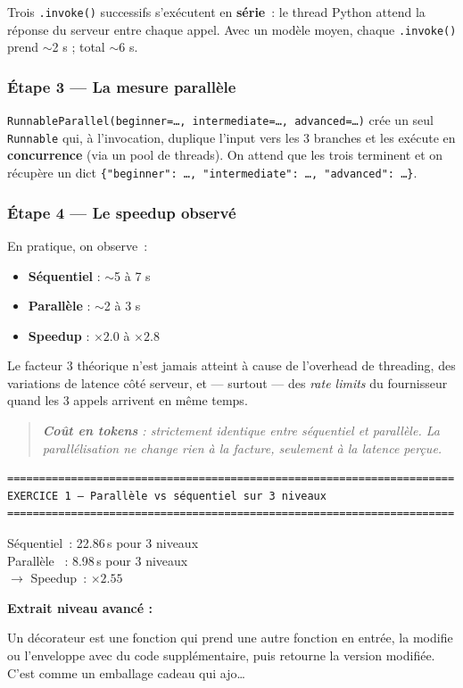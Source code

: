 \documentclass[11pt,a4paper]{article}
\begin{document}
Trois \texttt{.invoke()} successifs s'exécutent en \textbf{série}~: le
thread Python attend la réponse du serveur entre chaque appel. Avec un
modèle moyen, chaque \texttt{.invoke()} prend $\sim$2 s ; total $\sim$6 s.

\subsubsection*{Étape 3 — La mesure parallèle}

\texttt{RunnableParallel(beginner=\dots, intermediate=\dots, advanced=\dots)}
crée un seul \texttt{Runnable} qui, à l'invocation, duplique l'input vers
les 3 branches et les exécute en \textbf{concurrence} (via un pool de
threads). On attend que les trois terminent et on récupère un dict
\texttt{\{"beginner": \dots, "intermediate": \dots, "advanced": \dots\}}.

\subsubsection*{Étape 4 — Le speedup observé}

En pratique, on observe~:
\begin{itemize}[leftmargin=*]
  \item \textbf{Séquentiel} : $\sim$5 à 7 s
  \item \textbf{Parallèle}  : $\sim$2 à 3 s
  \item \textbf{Speedup}    : $\times 2.0$ à $\times 2.8$
\end{itemize}

Le facteur 3 théorique n'est jamais atteint à cause de l'overhead de
threading, des variations de latence côté serveur, et — surtout — des
\emph{rate limits} du fournisseur quand les 3 appels arrivent en même
temps.

\begin{quote}\itshape
\textbf{Coût en tokens} : strictement identique entre séquentiel et
parallèle. La parallélisation ne change rien à la facture, seulement à
la latence perçue.
\end{quote}

\begin{tcolorbox}[
  colback=white,
  colframe=black!50,
  coltitle=black,
  fonttitle=\footnotesize\bfseries,
  fontupper=\footnotesize,
  title=Sortie de l'exécution,
  breakable,
]
\begin{verbatim}
======================================================================
EXERCICE 1 — Parallèle vs séquentiel sur 3 niveaux
======================================================================
\end{verbatim}

Séquentiel~: 22.86\,s pour 3 niveaux\\
Parallèle ~: 8.98\,s pour 3 niveaux\\
$\rightarrow$ Speedup~: $\times 2.55$

\textbf{Extrait niveau avancé :}

Un décorateur est une fonction qui prend une autre fonction en entrée, la
modifie ou l'enveloppe avec du code supplémentaire, puis retourne la
version modifiée. C'est comme un emballage cadeau qui ajo\dots
\end{tcolorbox}
\end{document}
